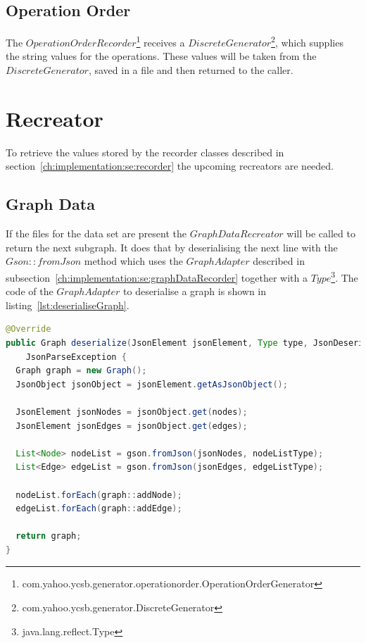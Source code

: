 \subsection{Operation Order}
\label{ch:implementation:se:operationOrderRecorder}
The $ OperationOrderRecorder $\footnote{com.yahoo.ycsb.generator.operationorder.OperationOrderGenerator} receives a \linebreak
$ DiscreteGenerator $\footnote{com.yahoo.ycsb.generator.DiscreteGenerator},
which supplies the string values for the operations.
These values will be taken from the $ DiscreteGenerator $,
saved in a file and then returned to the caller.

\section{Recreator}
\label{ch:implementation:se:recreator}
To retrieve the values stored by the recorder classes described in section~\ref{ch:implementation:se:recorder} the upcoming recreators are needed.

\subsection{Graph Data}
If the files for the data set are present the $ GraphDataRecreator $ will be called to return the next subgraph.
It does that by deserialising the next line with the $ Gson::fromJson $ method which uses the $ GraphAdapter $ described in subsection~\ref{ch:implementation:se:graphDataRecorder} together with a $ Type $\footnote{java.lang.reflect.Type}.
The code of the $ GraphAdapter $ to deserialise a graph is shown in listing~\ref{lst:deserialiseGraph}.

\begin{lstlisting}[language=Java,label={lst:deserialiseGraph},caption={Deserialisation of a graph object.}]
@Override
public Graph deserialize(JsonElement jsonElement, Type type, JsonDeserializationContext context) throws
    JsonParseException {
  Graph graph = new Graph();
  JsonObject jsonObject = jsonElement.getAsJsonObject();

  JsonElement jsonNodes = jsonObject.get(nodes);
  JsonElement jsonEdges = jsonObject.get(edges);

  List<Node> nodeList = gson.fromJson(jsonNodes, nodeListType);
  List<Edge> edgeList = gson.fromJson(jsonEdges, edgeListType);

  nodeList.forEach(graph::addNode);
  edgeList.forEach(graph::addEdge);

  return graph;
}
\end{lstlisting}

